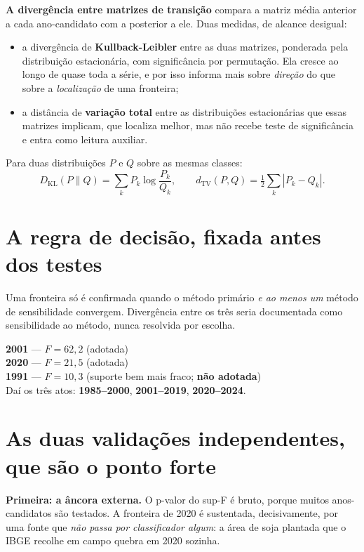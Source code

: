 \textbf{A divergência entre matrizes de transição} compara a matriz média
anterior a cada ano-candidato com a posterior a ele. Duas medidas, de alcance
desigual:

\begin{itemize}
\item a divergência de \textbf{Kullback-Leibler} entre as duas matrizes,
ponderada pela distribuição estacionária, com significância por permutação. Ela
cresce ao longo de quase toda a série, e por isso informa mais sobre
\emph{direção} do que sobre a \emph{localização} de uma fronteira;
\item a distância de \textbf{variação total} entre as distribuições
estacionárias que essas matrizes implicam, que localiza melhor, mas não recebe
teste de significância e entra como leitura auxiliar.
\end{itemize}

Para duas distribuições $P$ e $Q$ sobre as mesmas classes:
\begin{equation}
D_{\mathrm{KL}}(P \| Q) = \sum_{k} P_k \log \frac{P_k}{Q_k},
\qquad
d_{\mathrm{TV}}(P, Q) = \tfrac{1}{2}\sum_{k} |P_k - Q_k|.
\end{equation}

\section{A regra de decisão, fixada antes dos testes}

Uma fronteira só é confirmada quando o método primário \emph{e ao menos um}
método de sensibilidade convergem. Divergência entre os três seria documentada
como sensibilidade ao método, nunca resolvida por escolha.

\begin{ancora}
\textbf{2001} --- $F = 62{,}2$ (adotada) \\
\textbf{2020} --- $F = 21{,}5$ (adotada) \\
\textbf{1991} --- $F = 10{,}3$ (suporte bem mais fraco; \textbf{não adotada}) \\[4pt]
Daí os três atos: \textbf{1985--2000}, \textbf{2001--2019}, \textbf{2020--2024}.
\end{ancora}

\section{As duas validações independentes, que são o ponto forte}

\textbf{Primeira: a âncora externa.} O p-valor do sup-F é bruto, porque muitos
anos-candidatos são testados. A fronteira de 2020 é sustentada, decisivamente,
por uma fonte que \emph{não passa por classificador algum}: a área de soja
plantada que o IBGE recolhe em campo quebra em 2020 sozinha.

